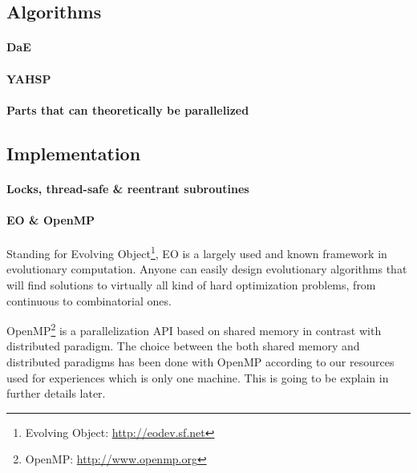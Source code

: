 \documentclass{sig-alternate}
\begin{document}
\subsection{Algorithms}

\paragraph{DaE} %
\paragraph{YAHSP} %
\paragraph{Parts that can theoretically be parallelized} %

\subsection{Implementation}

\paragraph{Locks, thread-safe \& reentrant subroutines} %

\paragraph{EO \& OpenMP} %


Standing for Evolving Object\footnote{Evolving Object: \url{http://eodev.sf.net}}, EO is a largely used and known framework in evolutionary computation. Anyone can easily design evolutionary algorithms that will find solutions to virtually all kind of hard optimization problems, from continuous to combinatorial ones.


OpenMP\footnote{OpenMP: \url{http://www.openmp.org}} is a parallelization API based on shared memory in contrast with distributed paradigm. The choice between the both shared memory and distributed paradigms has been done with OpenMP according to our resources used for experiences which is only one machine. This is going to be explain in further details later.
\end{document}
